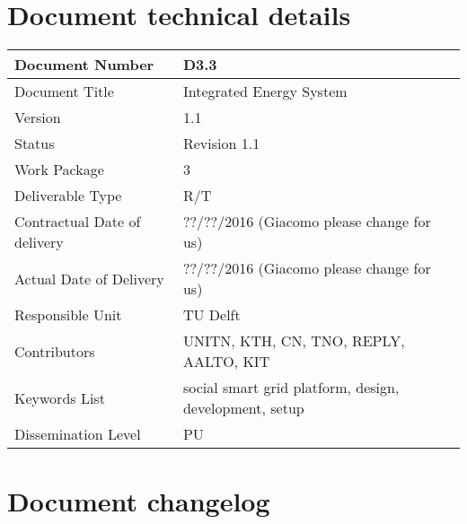 
\section*{Document technical details}

\begin{tabularx}{\textwidth}{|X|X|}
\hline
Document Number	& D3.3 \\ \hline
Document Title	&  Integrated Energy System\\ \hline
Version	&  1.1\\ \hline
Status	 &  Revision 1.1 \\ \hline
Work Package		&  3\\ \hline
Deliverable Type 	&  R/T \\ \hline
Contractual Date of delivery 	&  ??/??/2016 (Giacomo please change for us) \\ \hline
Actual Date of Delivery		&  ??/??/2016 (Giacomo please change for us) \\ \hline
Responsible Unit	&  TU Delft \\ \hline
Contributors & UNITN, KTH, CN, TNO, REPLY, AALTO, KIT  \\ \hline
Keywords List &  social smart grid platform, design, development, setup\\ \hline
Dissemination Level	&  PU \\ \hline
\end{tabularx}


\section*{Document changelog}

